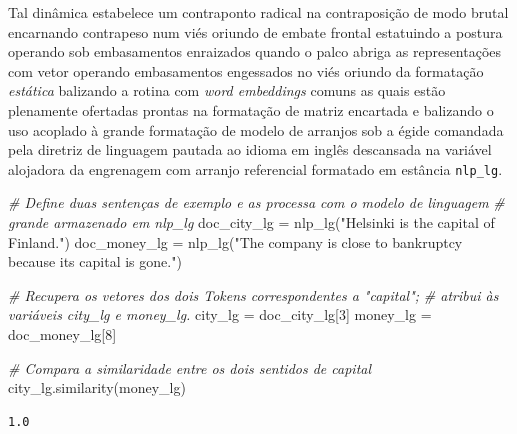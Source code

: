 \documentclass[
  brazilian,
]{article}
\newenvironment{Shaded}{}{}
\newcommand{\CommentTok}[1]{\textcolor[rgb]{0.38,0.63,0.69}{\textit{#1}}}
\newcommand{\DecValTok}[1]{\textcolor[rgb]{0.25,0.63,0.44}{#1}}
\newcommand{\NormalTok}[1]{#1}
\newcommand{\OperatorTok}[1]{\textcolor[rgb]{0.40,0.40,0.40}{#1}}
\newcommand{\StringTok}[1]{\textcolor[rgb]{0.25,0.44,0.63}{#1}}
\begin{document}
Tal dinâmica estabelece um contraponto radical na contraposição de modo
brutal encarnando contrapeso num viés oriundo de embate frontal
estatuindo a postura operando sob embasamentos enraizados quando o palco
abriga as representações com vetor operando embasamentos engessados no
viés oriundo da formatação \emph{estática} balizando a rotina com
\emph{word embeddings} comuns as quais estão plenamente ofertadas
prontas na formatação de matriz encartada e balizando o uso acoplado à
grande formatação de modelo de arranjos sob a égide comandada pela
diretriz de linguagem pautada ao idioma em inglês descansada na variável
alojadora da engrenagem com arranjo referencial formatado em estância
\texttt{nlp\_lg}.

\begin{Shaded}
\begin{Highlighting}[]
\CommentTok{\# Define duas sentenças de exemplo e as processa com o modelo de linguagem}
\CommentTok{\# grande armazenado em \textquotesingle{}nlp\_lg\textquotesingle{}}
\NormalTok{doc\_city\_lg }\OperatorTok{=}\NormalTok{ nlp\_lg(}\StringTok{"Helsinki is the capital of Finland."}\NormalTok{)}
\NormalTok{doc\_money\_lg }\OperatorTok{=}\NormalTok{ nlp\_lg(}\StringTok{"The company is close to bankruptcy because its capital is gone."}\NormalTok{)}

\CommentTok{\# Recupera os vetores dos dois Tokens correspondentes a "capital";}
\CommentTok{\# atribui às variáveis \textquotesingle{}city\_lg\textquotesingle{} e \textquotesingle{}money\_lg\textquotesingle{}.}
\NormalTok{city\_lg }\OperatorTok{=}\NormalTok{ doc\_city\_lg[}\DecValTok{3}\NormalTok{]}
\NormalTok{money\_lg }\OperatorTok{=}\NormalTok{ doc\_money\_lg[}\DecValTok{8}\NormalTok{]}

\CommentTok{\# Compara a similaridade entre os dois sentidos de \textquotesingle{}capital\textquotesingle{}}
\NormalTok{city\_lg.similarity(money\_lg)}
\end{Highlighting}
\end{Shaded}

\begin{verbatim}
1.0
\end{verbatim}
\end{document}
